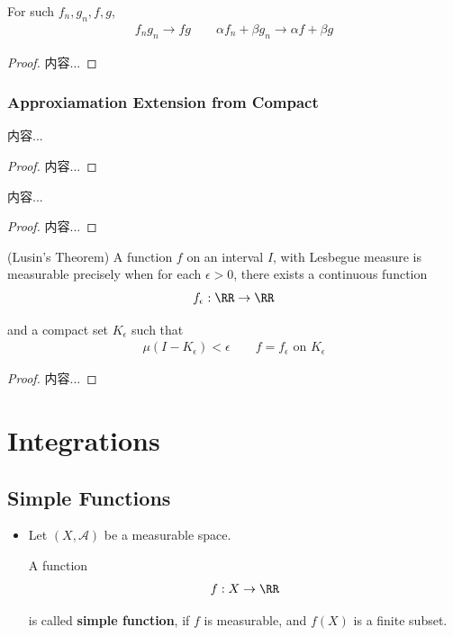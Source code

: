 \documentclass[Total.tex]{subfiles}
\begin{document}
		\begin{corollary} For such $f_n,g_n,f,g$,
			\begin{gather*}
				f_ng_n\rightarrow fg\qquad \alpha f_n+\beta g_n\rightarrow \alpha f+\beta g
			\end{gather*}
		\end{corollary}
		\begin{proof}
			内容...
		\end{proof}
		
		\subsubsection{Approxiamation Extension from Compact}
			\begin{lemma}
				内容...
			\end{lemma}
			\begin{proof}
				内容...
			\end{proof}
			
			\begin{proposition}
				内容...
			\end{proposition}
			\begin{proof}
				内容...
			\end{proof}
			
			\begin{theorem}
				(Lusin's Theorem) A function $f$ on an interval $I$, with Lesbegue measure is measurable precisely when for each $\epsilon>0$, there exists a continuous function 
				\begin{gather*}
					f_\epsilon:\RR\rightarrow \RR
				\end{gather*}
				
				and a compact set $K_\epsilon$ such that
				\begin{gather*}
					\mu(I-K_\epsilon)<\epsilon\qquad f=f_\epsilon\mbox{ on }K_\epsilon
				\end{gather*}
			\end{theorem}
			\begin{proof}
				内容...
			\end{proof}
		\section{Integrations}
			\subsection{Simple Functions}
		
			\begin{Def}
				\begin{itemize}
					\item 
					Let $(X,\mathcal{A})$ be a measurable space.
					
					A function
					\begin{gather*}
						f:X\rightarrow \RR
					\end{gather*}
					
					is called \textbf{simple function}, if $f$ is measurable, and $f(X)$ is a finite subset. 
				\end{itemize}
			\end{Def}
			
\end{document}
